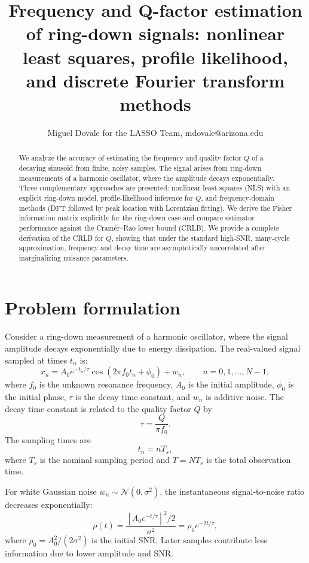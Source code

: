 \documentclass[11pt]{article}
\title{Frequency and Q-factor estimation of ring-down signals: nonlinear least squares, profile likelihood, and discrete Fourier transform methods}
\author{Miguel Dovale for the LASSO Team, mdovale@arizona.edu}
\date{}
\begin{document}
\maketitle

\begin{abstract}
We analyze the accuracy of estimating the frequency and quality factor $Q$ of a decaying sinusoid from finite, noisy samples. The signal arises from ring-down measurements of a harmonic oscillator, where the amplitude decays exponentially. Three complementary approaches are presented: nonlinear least squares (NLS) with an explicit ring-down model, profile-likelihood inference for $Q$, and frequency-domain methods (DFT followed by peak location with Lorentzian fitting). We derive the Fisher information matrix explicitly for the ring-down case and compare estimator performance against the Cram\'er--Rao lower bound (CRLB). We provide a complete derivation of the CRLB for $Q$, showing that under the standard high-SNR, many-cycle approximation, frequency and decay time are asymptotically uncorrelated after marginalizing nuisance parameters.
\end{abstract}

\section{Problem formulation}

Consider a ring-down measurement of a harmonic oscillator, where the signal amplitude decays exponentially due to energy dissipation. The real-valued signal sampled at times $t_n$ is:
\begin{equation}
x_n = A_0 e^{-t_n/\tau}\cos(2\pi f_0 t_n + \phi_0) + w_n,\qquad n=0,1,\dots,N-1,
\end{equation}
where $f_0$ is the unknown resonance frequency, $A_0$ is the initial amplitude, $\phi_0$ is the initial phase, $\tau$ is the decay time constant, and $w_n$ is additive noise. The decay time constant is related to the quality factor $Q$ by
\begin{equation}
\tau = \frac{Q}{\pi f_0}.
\end{equation}
The sampling times are
\begin{equation}
t_n = nT_s,
\end{equation}
where $T_s$ is the nominal sampling period and $T = NT_s$ is the total observation time.

For white Gaussian noise $w_n \sim \mathcal{N}(0,\sigma^2)$, the instantaneous signal-to-noise ratio decreases exponentially:
\begin{equation}
\rho(t) = \frac{[A_0 e^{-t/\tau}]^2/2}{\sigma^2} = \rho_0 e^{-2t/\tau},
\end{equation}
where $\rho_0 = A_0^2/(2\sigma^2)$ is the initial SNR. Later samples contribute less information due to lower amplitude and SNR.
\end{document}
